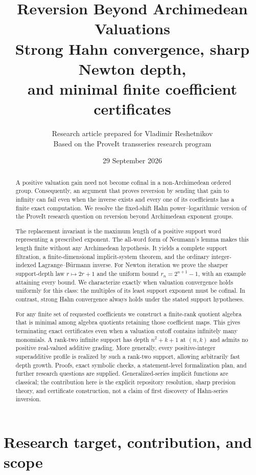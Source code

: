 \documentclass[11pt,a4paper]{article}
\title{\textbf{Reversion Beyond Archimedean Valuations}\\[0.65em]
\large Strong Hahn convergence, sharp Newton depth,\\
and minimal finite coefficient certificates}
\author{Research article prepared for Vladimir Reshetnikov\\
\small Based on the ProveIt transseries research program}
\date{29 September 2026}
\theoremstyle{definition}
\theoremstyle{remark}
\begin{document}
\maketitle
\begin{abstract}
A positive valuation gain need not become cofinal in a non-Archimedean
ordered group. Consequently, an argument that proves reversion by sending
that gain to infinity can fail even when the inverse exists and every one
of its coefficients has a finite exact computation. We resolve the
fixed-shift Hahn power--logarithmic version of the ProveIt research question
on reversion beyond Archimedean exponent groups.

The replacement invariant is the maximum length of a positive support word
representing a prescribed exponent. The all-word form of Neumann's lemma
makes this length finite without any Archimedean hypothesis. It yields a
complete support filtration, a finite-dimensional implicit-system theorem,
and the ordinary integer-indexed Lagrange--B\"urmann inverse. For Newton
iteration we prove the sharper support-depth law $r\mapsto2r+1$ and the
uniform bound $r_n=2^{n+1}-1$, with an example attaining every bound.
We characterize exactly when valuation convergence holds uniformly for
this class: the multiples of its least support exponent must be cofinal.
In contrast, strong Hahn convergence always holds under the stated support
hypotheses.

For any finite set of requested coefficients we construct a finite-rank
quotient algebra that is minimal among algebra quotients retaining those
coefficient maps. This gives terminating exact certificates even when a
valuation cutoff contains infinitely many monomials. A rank-two infinite
support has depth $n^2+k+1$ at $(n,k)$ and admits no positive real-valued
additive grading. More generally, every positive-integer superadditive
profile is realized by such a rank-two support, allowing arbitrarily fast
depth growth. Proofs, exact symbolic checks, a statement-level formalization
plan, and further research questions are supplied. Generalized-series
implicit functions are classical; the contribution here is the explicit
repository resolution, sharp precision theory, and certificate construction,
not a claim of first discovery of Hahn-series inversion.
\end{abstract}
\newpage
\begingroup
\small
\setlength{\parskip}{0pt}
\tableofcontents
\endgroup
\newpage

\section{Research target, contribution, and scope}
\label{sec:scope}
\end{document}
